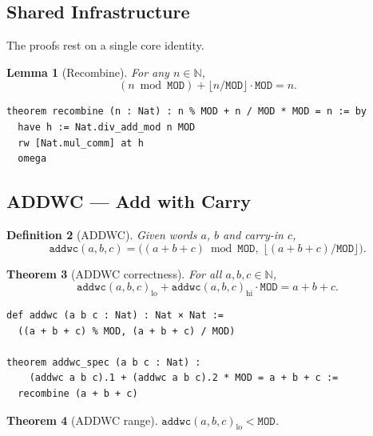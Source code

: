 \documentclass[11pt,a4paper]{article}
\newtheorem{theorem}{Theorem}[section]
\newtheorem{lemma}[theorem]{Lemma}
\newtheorem{definition}[theorem]{Definition}
\begin{document}
\subsection{Shared Infrastructure}

The proofs rest on a single core identity.

\begin{lemma}[Recombine]
\label{lem:recombine}
For any $n \in \mathbb{N}$,
\[
  (n \bmod \mathtt{MOD}) + \lfloor n / \mathtt{MOD} \rfloor
  \cdot \mathtt{MOD} = n.
\]
\end{lemma}

\begin{lstlisting}[style=lean,caption={Recombine lemma}]
theorem recombine (n : Nat) : n % MOD + n / MOD * MOD = n := by
  have h := Nat.div_add_mod n MOD
  rw [Nat.mul_comm] at h
  omega
\end{lstlisting}

\subsection{ADDWC --- Add with Carry}

\begin{definition}[ADDWC]
Given words $a$, $b$ and carry-in $c$,
\[
  \mathtt{addwc}(a, b, c) = \bigl((a + b + c) \bmod \mathtt{MOD},\;
  \lfloor(a + b + c) / \mathtt{MOD}\rfloor\bigr).
\]
\end{definition}

\begin{theorem}[ADDWC correctness]
\label{thm:addwc}
For all $a, b, c \in \mathbb{N}$,
\[
  \mathtt{addwc}(a,b,c)_{\mathrm{lo}}
  + \mathtt{addwc}(a,b,c)_{\mathrm{hi}} \cdot \mathtt{MOD}
  = a + b + c.
\]
\end{theorem}

\begin{lstlisting}[style=lean,caption={ADDWC definition and correctness}]
def addwc (a b c : Nat) : Nat × Nat :=
  ((a + b + c) % MOD, (a + b + c) / MOD)

theorem addwc_spec (a b c : Nat) :
    (addwc a b c).1 + (addwc a b c).2 * MOD = a + b + c :=
  recombine (a + b + c)
\end{lstlisting}

\begin{theorem}[ADDWC range]
\label{thm:addwc-range}
$\mathtt{addwc}(a,b,c)_{\mathrm{lo}} < \mathtt{MOD}$.
\end{theorem}
\end{document}
